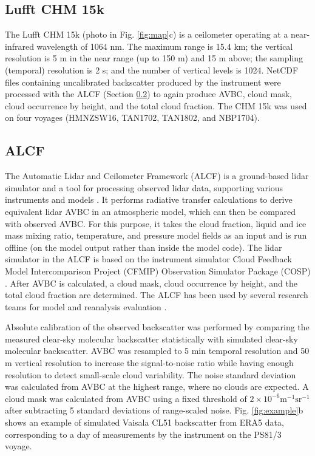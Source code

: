 \documentclass[draft]{agujournal2019}
\begin{document}
\subsection{Lufft CHM 15k}
\label{sec:chm15k}

The Lufft CHM 15k (photo in Fig. \ref{fig:map}c) is a ceilometer operating at a near-infrared wavelength of 1064 nm. The maximum range is 15.4 km; the vertical resolution is 5 m in the near range (up to 150 m) and 15 m above; the sampling (temporal) resolution is 2 s; and the number of vertical levels is 1024. NetCDF files containing uncalibrated backscatter produced by the instrument were processed with the ALCF (Section \ref{sec:alcf}) to again produce AVBC, cloud mask, cloud occurrence by height, and the total cloud fraction. The CHM 15k was used on four voyages (HMNZSW16, TAN1702, TAN1802, and NBP1704).

\subsection{ALCF}
\label{sec:alcf}

The Automatic Lidar and Ceilometer Framework (ALCF) is a ground-based lidar simulator and a tool for processing observed lidar data, supporting various instruments and models . It performs radiative transfer calculations to derive equivalent lidar AVBC in an atmospheric model, which can then be compared with observed AVBC. For this purpose, it takes the cloud fraction, liquid and ice mass mixing ratio, temperature, and pressure model fields as an input and is run offline (on the model output rather than inside the model code). The lidar simulator in the ALCF is based on the instrument simulator Cloud Feedback Model Intercomparison Project (CFMIP) Observation Simulator Package (COSP) . After AVBC is calculated, a cloud mask, cloud occurrence by height, and the total cloud fraction are determined. The ALCF has been used by several research teams for model and reanalysis evaluation .

Absolute calibration of the observed backscatter was performed by comparing the measured clear-sky molecular backscatter statistically with simulated clear-sky molecular backscatter. AVBC was resampled to 5 min temporal resolution and 50 m vertical resolution to increase the signal-to-noise ratio while having enough resolution to detect small-scale cloud variability. The noise standard deviation was calculated from AVBC at the highest range, where no clouds are expected. A cloud mask was calculated from AVBC using a fixed threshold of $\mathrm{2\times 10^{-6} m^{-1}sr^{-1}}$ after subtracting 5 standard deviations of range-scaled noise. Fig. \ref{fig:example}b shows an example of simulated Vaisala CL51 backscatter from ERA5 data, corresponding to a day of measurements by the instrument on the PS81/3 voyage.
\end{document}
